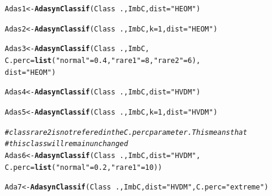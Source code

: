 \documentclass[10pt,a4paper]{article}\usepackage[]{graphicx}\usepackage[]{color}
\makeatletter
\newcommand{\hlnum}[1]{\textcolor[rgb]{0.686,0.059,0.569}{#1}}%
\newcommand{\hlstr}[1]{\textcolor[rgb]{0.192,0.494,0.8}{#1}}%
\newcommand{\hlcom}[1]{\textcolor[rgb]{0.678,0.584,0.686}{\textit{#1}}}%
\newcommand{\hlopt}[1]{\textcolor[rgb]{0,0,0}{#1}}%
\newcommand{\hlstd}[1]{\textcolor[rgb]{0.345,0.345,0.345}{#1}}%
\newcommand{\hlkwb}[1]{\textcolor[rgb]{0.69,0.353,0.396}{#1}}%
\newcommand{\hlkwc}[1]{\textcolor[rgb]{0.333,0.667,0.333}{#1}}%
\newcommand{\hlkwd}[1]{\textcolor[rgb]{0.737,0.353,0.396}{\textbf{#1}}}%
\newenvironment{kframe}{%
 \def\at@end@of@kframe{}%
 \ifinner\ifhmode%
  \def\at@end@of@kframe{\end{minipage}}%
  \begin{minipage}{\columnwidth}%
 \fi\fi%
 \def\FrameCommand##1{\hskip\@totalleftmargin \hskip-\fboxsep
 \colorbox{shadecolor}{##1}\hskip-\fboxsep
     \hskip-\linewidth \hskip-\@totalleftmargin \hskip\columnwidth}%
 \MakeFramed {\advance\hsize-\width
   \@totalleftmargin\z@ \linewidth\hsize
   \@setminipage}}%
 {\par\unskip\endMakeFramed%
 \at@end@of@kframe}
\newenvironment{knitrout}{}{} %
\makeatother
\begin{document}
\begin{knitrout}\footnotesize
{}\color{fgcolor}\begin{kframe}
\begin{alltt}
\hlstd{Adas1} \hlkwb{<-} \hlkwd{AdasynClassif}\hlstd{(Class}\hlopt{~}\hlstd{., ImbC,} \hlkwc{dist} \hlstd{=} \hlstr{"HEOM"}\hlstd{)}

\hlstd{Adas2} \hlkwb{<-} \hlkwd{AdasynClassif}\hlstd{(Class}\hlopt{~}\hlstd{., ImbC,} \hlkwc{k} \hlstd{=} \hlnum{1}\hlstd{,} \hlkwc{dist}\hlstd{=}\hlstr{"HEOM"}\hlstd{)}

\hlstd{Adas3} \hlkwb{<-} \hlkwd{AdasynClassif}\hlstd{(Class}\hlopt{~}\hlstd{., ImbC,}
                    \hlkwc{C.perc} \hlstd{=} \hlkwd{list}\hlstd{(}\hlstr{"normal"} \hlstd{=} \hlnum{0.4}\hlstd{,} \hlstr{"rare1"} \hlstd{=} \hlnum{8}\hlstd{,} \hlstr{"rare2"} \hlstd{=} \hlnum{6}\hlstd{),}
                    \hlkwc{dist} \hlstd{=} \hlstr{"HEOM"}\hlstd{)}
\end{alltt}


{\ttfamily\noindent\bfseries{}}\begin{alltt}
\hlstd{Adas4} \hlkwb{<-} \hlkwd{AdasynClassif}\hlstd{(Class}\hlopt{~}\hlstd{., ImbC,} \hlkwc{dist} \hlstd{=} \hlstr{"HVDM"}\hlstd{)}

\hlstd{Adas5} \hlkwb{<-} \hlkwd{AdasynClassif}\hlstd{(Class}\hlopt{~}\hlstd{., ImbC,} \hlkwc{k} \hlstd{=} \hlnum{1}\hlstd{,} \hlkwc{dist} \hlstd{=} \hlstr{"HVDM"}\hlstd{)}

\hlcom{# class rare2 is not refered in the C.perc parameter. This means that}
\hlcom{# this class will remain unchanged}
\hlstd{Adas6} \hlkwb{<-} \hlkwd{AdasynClassif}\hlstd{(Class}\hlopt{~}\hlstd{., ImbC,} \hlkwc{dist} \hlstd{=} \hlstr{"HVDM"}\hlstd{,}
                    \hlkwc{C.perc} \hlstd{=} \hlkwd{list}\hlstd{(}\hlstr{"normal"}\hlstd{=}\hlnum{0.2}\hlstd{,} \hlstr{"rare1"}\hlstd{=}\hlnum{10}\hlstd{))}
\end{alltt}


{\ttfamily\noindent\bfseries{}}\begin{alltt}
\hlstd{Ada7} \hlkwb{<-} \hlkwd{AdasynClassif}\hlstd{(Class}\hlopt{~}\hlstd{., ImbC,} \hlkwc{dist} \hlstd{=} \hlstr{"HVDM"}\hlstd{,} \hlkwc{C.perc}\hlstd{=}\hlstr{"extreme"}\hlstd{)}
\end{alltt}


{\ttfamily\noindent\bfseries{}}\end{kframe}
\end{knitrout}
\end{document}
